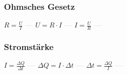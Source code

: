 \subsubsection{Ohmsches Gesetz} 
\begin{minipage}{0.45\textwidth} 
\end{minipage} 
\begin{minipage}{0.45\textwidth} 
 
\end{minipage} 
$ R = \frac{U}{I} $ \textcolor{lightgray}{\textbf{---}} 
$ U = R\cdot I $ \textcolor{lightgray}{\textbf{---}} 
$ I = \frac{U}{R} $ \textcolor{lightgray}{\textbf{---}} 

\subsubsection{Stromstärke} 
\begin{minipage}{0.45\textwidth} 
\end{minipage} 
\begin{minipage}{0.45\textwidth} 
 
\end{minipage} 
$ I = \frac{\Delta Q}{\Delta t} $ \textcolor{lightgray}{\textbf{---}} 
$ \Delta Q =I\cdot \Delta t $ \textcolor{lightgray}{\textbf{---}} 
$ \Delta t = \frac{\Delta Q}{I} $ \textcolor{lightgray}{\textbf{---}} 

